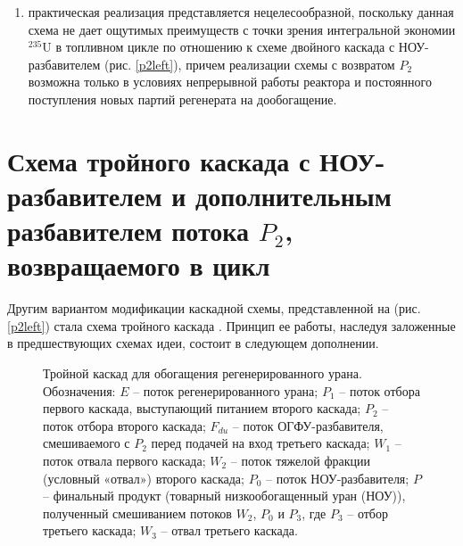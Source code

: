\begin{enumerate}
    \item практическая реализация представляется нецелесообразной, поскольку данная схема не дает ощутимых преимуществ с точки зрения интегральной экономии $^{235}$U в топливном цикле по отношению к схеме двойного каскада с НОУ-разбавителем (рис. \ref{p2left}), причем реализации схемы с возвратом $P_2$ возможна только в условиях непрерывной работы реактора и постоянного поступления новых партий регенерата на дообогащение.
\end{enumerate}


\section{Схема тройного каскада с НОУ-разбавителем и дополнительным разбавителем потока $P_2$, возвращаемого в цикл}

Другим вариантом модификации каскадной схемы, представленной на (рис. \ref{p2left}) стала схема тройного каскада \cite{smirnovApplyingEnrichmentCapacities2018}. Принцип ее работы, наследуя заложенные в предшествующих схемах идеи, состоит в следующем дополнении.

\begin{figure}[ht]
    \caption{Тройной каскад для обогащения регенерированного урана. Обозначения: $E$ -- поток регенерированного урана; $P_1$ -- поток отбора первого каскада, выступающий питанием второго каскада; $P_2$ -- поток отбора второго каскада; $F_{du}$ -- поток ОГФУ-разбавителя, смешиваемого с $P_2$ перед подачей на вход третьего каскада; $W_1$ -- поток отвала первого каскада; $W_2$ -- поток тяжелой фракции (условный «отвал») второго каскада; $P_0$ -- поток НОУ-разбавителя; $P$ -- финальный продукт (товарный низкообогащенный уран (НОУ)), полученный смешиванием потоков $W_2$, $P_0$ и $P_3$, где $P_3$ -- отбор третьего каскада; $W_3$ -- отвал третьего каскада.}\label{p2_withDepU}
\end{figure}

